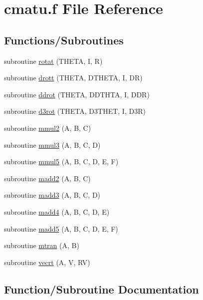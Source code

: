 \hypertarget{cmatu_8f}{}\section{cmatu.\+f File Reference}
\label{cmatu_8f}
\subsection*{Functions/\+Subroutines}
\begin{DoxyCompactItemize}
\item 
subroutine \hyperlink{cmatu_8f_a244b79ca75dda565e26ccbc7e6a27059}{rotat} (T\+H\+E\+TA, I, R)
\item 
subroutine \hyperlink{cmatu_8f_a05b4899387627a832cbcf67e652cbe40}{drott} (T\+H\+E\+TA, D\+T\+H\+E\+TA, I, DR)
\item 
subroutine \hyperlink{cmatu_8f_af7c3cf1d6c9db9ad09c09e0489ded485}{ddrot} (T\+H\+E\+TA, D\+D\+T\+H\+TA, I, D\+DR)
\item 
subroutine \hyperlink{cmatu_8f_a35018f10fd38c51a1a593c2401d2653a}{d3rot} (T\+H\+E\+TA, D3\+T\+H\+ET, I, D3R)
\item 
subroutine \hyperlink{cmatu_8f_a0c394eb642450bfe952b048edac108f8}{mmul2} (A, B, C)
\item 
subroutine \hyperlink{cmatu_8f_aac70d26c724db006ea31416b5d0a4309}{mmul3} (A, B, C, D)
\item 
subroutine \hyperlink{cmatu_8f_a72bb4b183b3bc07c3f85a40d41b9c0ba}{mmul5} (A, B, C, D, E, F)
\item 
subroutine \hyperlink{cmatu_8f_a263077adffea85cb61d29e749c1fdad4}{madd2} (A, B, C)
\item 
subroutine \hyperlink{cmatu_8f_afe0b8cd203c04f0a1dc8d555a995432d}{madd3} (A, B, C, D)
\item 
subroutine \hyperlink{cmatu_8f_aef2926b4c123f315cc08882e8dad33c4}{madd4} (A, B, C, D, E)
\item 
subroutine \hyperlink{cmatu_8f_a58b331fad230ecbbbe5829435bdbd426}{madd5} (A, B, C, D, E, F)
\item 
subroutine \hyperlink{cmatu_8f_a625af018d14a86ef503ced306a1523a0}{mtran} (A, B)
\item 
subroutine \hyperlink{cmatu_8f_a77ea712db6bef8c4347335d795ab08ea}{vecrt} (A, V, RV)
\end{DoxyCompactItemize}


\subsection{Function/\+Subroutine Documentation}
\mbox{\label{cmatu_8f_a35018f10fd38c51a1a593c2401d2653a}} 
